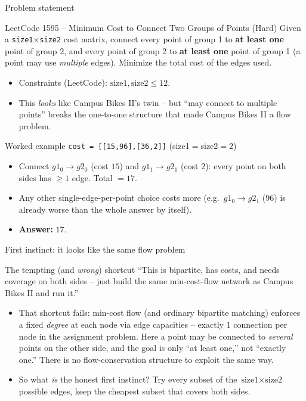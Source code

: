 \documentclass[11pt,aspectratio=169]{beamer}
\begin{document}
\begin{frame}{Problem statement}
  \begin{block}{LeetCode 1595 -- Minimum Cost to Connect Two Groups of Points
  (\textcolor{red!60!black}{Hard})}
    Given a \texttt{size1}$\times$\texttt{size2} cost matrix, connect every point of
    group 1 to \textbf{at least one} point of group 2, and every point of group 2 to
    \textbf{at least one} point of group 1 (a point may use \emph{multiple} edges).
    Minimize the total cost of the edges used.
  \end{block}
  \begin{itemize}
    \item Constraints (LeetCode): $\text{size1}, \text{size2} \le 12$.
    \item This \emph{looks} like Campus Bikes II's twin -- but ``may connect to
    multiple points'' breaks the one-to-one structure that made Campus Bikes II a flow
    problem.
  \end{itemize}
\end{frame}

\begin{frame}{Worked example}
  \small
  \texttt{cost = [[15,96],[36,2]]} \quad (size1$=$size2$=2$)
  \begin{itemize}
    \item Connect $g1_0 \to g2_0$ (cost $15$) and $g1_1 \to g2_1$ (cost $2$): every
    point on both sides has $\ge 1$ edge. Total $=17$.
    \item Any other single-edge-per-point choice costs more (e.g.\ $g1_0\to g2_1$
    ($96$) is already worse than the whole answer by itself).
    \item \textbf{Answer: } $17$.
  \end{itemize}
\end{frame}

\begin{frame}{First instinct: it looks like the same flow problem}
  \begin{block}{The tempting (and \emph{wrong}) shortcut}
    ``This is bipartite, has costs, and needs coverage on both sides -- just build the
    same min-cost-flow network as Campus Bikes II and run it.''
  \end{block}
  \begin{itemize}
    \item That shortcut fails: min-cost flow (and ordinary bipartite matching) enforces
    a fixed \emph{degree} at each node via edge capacities -- exactly $1$ connection per
    node in the assignment problem. Here a point may be connected to \emph{several}
    points on the other side, and the goal is only ``at least one,'' not ``exactly
    one.'' There is no flow-conservation structure to exploit the same way.
    \item So what \emph{is} the honest first instinct? Try every subset of the
    $\text{size1}\times\text{size2}$ possible edges, keep the cheapest subset that
    covers both sides.
  \end{itemize}
\end{frame}
\end{document}
